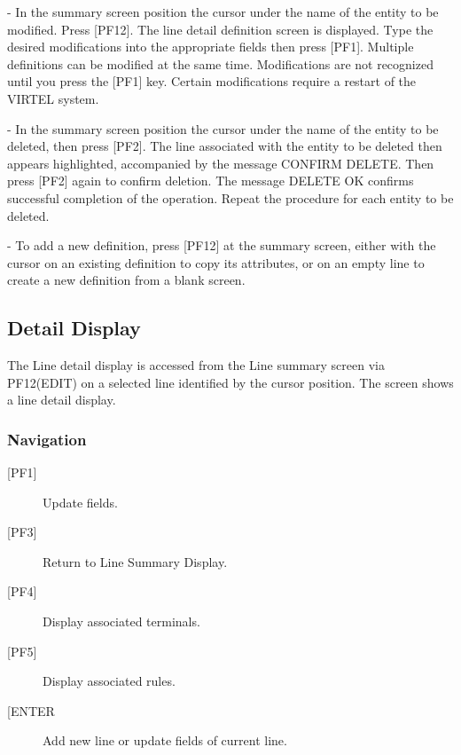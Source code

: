 \documentclass[letterpaper,10pt,english]{sphinxmanual}
\begin{document}
 - In the summary screen position the cursor under the name of the entity to be modified. Press {[}PF12{]}. The line detail definition screen is displayed. Type the desired modifications into the appropriate fields then press {[}PF1{]}. Multiple definitions can be modified at the same time. Modifications are not recognized until you press the {[}PF1{]} key. Certain modifications require a restart of the VIRTEL system.

 - In the summary screen position the cursor under the name of the entity to be deleted, then press {[}PF2{]}. The line associated with the entity to be deleted then appears highlighted, accompanied by the message CONFIRM DELETE. Then press {[}PF2{]} again to confirm deletion. The message DELETE OK confirms successful completion of the operation. Repeat the procedure for each entity to be deleted.

 - To add a new definition, press {[}PF12{]} at the summary screen, either with the cursor on an existing definition to copy its attributes, or on an empty line to create a new definition from a blank screen.

\newpage


\subsection{Detail Display}
\label{\detokenize{connectivity_guide:detail-display}}\label{\detokenize{connectivity_guide:index-7}}
The Line detail display is accessed from the Line summary screen via PF12(EDIT) on a selected line identified by the cursor position. The screen shows a line detail display.



\subsubsection{Navigation}
\label{\detokenize{connectivity_guide:id1}}\begin{description}
\item[{{[}PF1{]}}] \leavevmode
Update fields.

\item[{{[}PF3{]}}] \leavevmode
Return to Line Summary Display.

\item[{{[}PF4{]}}] \leavevmode
Display associated terminals.

\item[{{[}PF5{]}}] \leavevmode
Display associated rules.

\item[{{[}ENTER}] \leavevmode
Add new line or update fields of current line.

\end{description}
\end{document}
